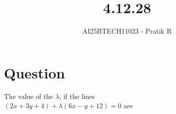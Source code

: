 \documentclass[journal]{IEEEtran}
\begin{document}

\vspace{3cm}

\title{4.12.28}
\author{AI25BTECH11023 - Pratik R}
{\let\newpage\relax\maketitle}

\renewcommand{\thefigure}{\theenumi}
\renewcommand{\thetable}{\theenumi}
\setlength{\intextsep}{10pt} %


\renewcommand{\thetable}{\theenumi}


\section*{\textbf{Question}}
The value of the $\lambda$,  if the lines\\$(2x+3y+4)+\lambda(6x-y+12)=0$ are


\end{document}
